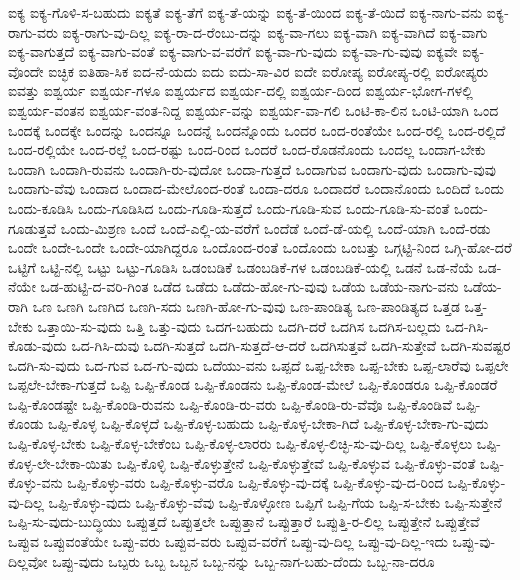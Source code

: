 {ಐಕ್ಯ
ಐಕ್ಯ-ಗೊಳಿ-ಸ-ಬಹುದು
ಐಕ್ಯತೆ
ಐಕ್ಯ-ತೆಗೆ
ಐಕ್ಯ-ತೆ-ಯನ್ನು
ಐಕ್ಯ-ತೆ-ಯಿಂದ
ಐಕ್ಯ-ತೆ-ಯಿದೆ
ಐಕ್ಯ-ನಾಗು-ವನು
ಐಕ್ಯ-ರಾಗು-ವರು
ಐಕ್ಯ-ರಾಗು-ವು-ದಿಲ್ಲ
ಐಕ್ಯ-ರಾ-ದ-ರೆಂಬು-ದನ್ನು
ಐಕ್ಯ-ವಾ-ಗಲು
ಐಕ್ಯ-ವಾಗಿ
ಐಕ್ಯ-ವಾಗಿದೆ
ಐಕ್ಯ-ವಾಗು
ಐಕ್ಯ-ವಾಗುತ್ತದೆ
ಐಕ್ಯ-ವಾಗು-ವಂತೆ
ಐಕ್ಯ-ವಾಗು-ವ-ವರೆಗೆ
ಐಕ್ಯ-ವಾ-ಗು-ವುದು
ಐಕ್ಯ-ವಾ-ಗು-ವುವು
ಐಕ್ಯವೇ
ಐಕ್ಯ-ವೊಂದೇ
ಐಚ್ಛಿಕ
ಐತಿಹಾ-ಸಿಕ
ಐದ-ನೆ-ಯದು
ಐದು
ಐದು-ಸಾ-ವಿರ
ಐದೇ
ಐರೋಪ್ಯ
ಐರೋಪ್ಯ-ರಲ್ಲಿ
ಐರೋಪ್ಯರು
ಐವತ್ತು
ಐಶ್ವರ್ಯ
ಐಶ್ವರ್ಯ-ಗಳೂ
ಐಶ್ವರ್ಯದ
ಐಶ್ವರ್ಯ-ದಲ್ಲಿ
ಐಶ್ವರ್ಯ-ದಿಂದ
ಐಶ್ವರ್ಯ-ಭೋಗ-ಗಳಲ್ಲಿ
ಐಶ್ವರ್ಯ-ವಂತನ
ಐಶ್ವರ್ಯ-ವಂತ-ನಿದ್ದ
ಐಶ್ವರ್ಯ-ವನ್ನು
ಐಶ್ವರ್ಯ-ವಾ-ಗಲಿ
ಒಂಟಿ-ಕಾ-ಲಿನ
ಒಂಟಿ-ಯಾಗಿ
ಒಂದ
ಒಂದಕ್ಕೆ
ಒಂದಕ್ಕೇ
ಒಂದನ್ನು
ಒಂದನ್ನೂ
ಒಂದನ್ನೆ
ಒಂದನ್ನೊಂದು
ಒಂದರ
ಒಂದ-ರಂತೆಯೇ
ಒಂದ-ರಲ್ಲಿ
ಒಂದ-ರಲ್ಲಿದೆ
ಒಂದ-ರಲ್ಲಿಯೇ
ಒಂದ-ರಲ್ಲೆ
ಒಂದ-ರಷ್ಟು
ಒಂದ-ರಿಂದ
ಒಂದರೆ
ಒಂದ-ರೊಡನೊಂದು
ಒಂದಲ್ಲ
ಒಂದಾಗ-ಬೇಕು
ಒಂದಾಗಿ
ಒಂದಾಗಿ-ರುವನು
ಒಂದಾಗಿ-ರು-ವುದೋ
ಒಂದಾ-ಗುತ್ತದೆ
ಒಂದಾಗುವ
ಒಂದಾಗು-ವುದು
ಒಂದಾಗು-ವುವು
ಒಂದಾಗು-ವೆವು
ಒಂದಾದ
ಒಂದಾದ-ಮೇಲೊಂದ-ರಂತೆ
ಒಂದಾ-ದರೂ
ಒಂದಾದರೆ
ಒಂದಾನೊಂದು
ಒಂದಿದೆ
ಒಂದು
ಒಂದು-ಕೂಡಿಸಿ
ಒಂದು-ಗೂಡಿಸಿದ
ಒಂದು-ಗೂಡಿ-ಸುತ್ತದೆ
ಒಂದು-ಗೂಡಿ-ಸುವ
ಒಂದು-ಗೂಡಿ-ಸು-ವಂತೆ
ಒಂದು-ಗೂಡುತ್ತವೆ
ಒಂದು-ಮಿಶ್ರಣ
ಒಂದೆ
ಒಂದೆ-ಎಲ್ಲಿ-ಯ-ವರೆಗೆ
ಒಂದೆಡೆ
ಒಂದೆ-ಡೆ-ಯಲ್ಲಿ
ಒಂದೆ-ಯಾಗಿ
ಒಂದೆ-ರಡು
ಒಂದೇ
ಒಂದೇ-ಒಂದೇ
ಒಂದೇ-ಯಾಗಿದ್ದರೂ
ಒಂದೊಂದ-ರಂತೆ
ಒಂದೊಂದು
ಒಂಬತ್ತು
ಒಗ್ಗಟ್ಟಿ-ನಿಂದ
ಒಗ್ಗಿ-ಹೋ-ದರೆ
ಒಟ್ಟಿಗೆ
ಒಟ್ಟಿ-ನಲ್ಲಿ
ಒಟ್ಟು
ಒಟ್ಟು-ಗೂಡಿಸಿ
ಒಡಂಬಡಿಕೆ
ಒಡಂಬಡಿಕೆ-ಗಳ
ಒಡಂಬಡಿಕೆ-ಯಲ್ಲಿ
ಒಡನೆ
ಒಡ-ನೆಯೆ
ಒಡ-ನೆಯೇ
ಒಡ-ಹುಟ್ಟಿ-ದ-ವರಿ-ಗಿಂತ
ಒಡೆದ
ಒಡೆದು
ಒಡೆದು-ಹೋ-ಗು-ವುವು
ಒಡೆಯ
ಒಡೆಯ-ನಾಗು-ವನು
ಒಡೆಯ-ರಾಗಿ
ಒಣ
ಒಣಗಿ
ಒಣಗಿದ
ಒಣಗಿ-ಸದು
ಒಣಗಿ-ಹೋ-ಗು-ವುವು
ಒಣ-ಪಾಂಡಿತ್ಯ
ಒಣ-ಪಾಂಡಿತ್ಯದ
ಒತ್ತಡ
ಒತ್ತ-ಬೇಕು
ಒತ್ತಾಯಿ-ಸು-ವುದು
ಒತ್ತಿ
ಒತ್ತು-ವುದು
ಒದಗ-ಬಹುದು
ಒದಗಿ-ದರೆ
ಒದಗಿಸ
ಒದಗಿಸ-ಬಲ್ಲದು
ಒದ-ಗಿಸಿ-ಕೊಡು-ವುದು
ಒದ-ಗಿಸಿ-ದುವು
ಒದಗಿ-ಸುತ್ತದೆ
ಒದಗಿ-ಸುತ್ತದೆ-ಆ-ದರೆ
ಒದಗಿಸುತ್ತವೆ
ಒದಗಿ-ಸುತ್ತೇವೆ
ಒದಗಿ-ಸುವಷ್ಟರ
ಒದಗಿ-ಸು-ವುದು
ಒದ-ಗುವ
ಒದ-ಗು-ವುದು
ಒದೆಯು-ವನು
ಒಪ್ಪದೆ
ಒಪ್ಪ-ಬೇಕಾ
ಒಪ್ಪ-ಬೇಕು
ಒಪ್ಪ-ಲಾರೆವು
ಒಪ್ಪಲೇ
ಒಪ್ಪಲೇ-ಬೇಕಾ-ಗುತ್ತದೆ
ಒಪ್ಪಿ
ಒಪ್ಪಿ-ಕೊಂಡ
ಒಪ್ಪಿ-ಕೊಂಡನು
ಒಪ್ಪಿ-ಕೊಂಡ-ಮೇಲೆ
ಒಪ್ಪಿ-ಕೊಂಡರೂ
ಒಪ್ಪಿ-ಕೊಂಡರೆ
ಒಪ್ಪಿ-ಕೊಂಡಷ್ಟೇ
ಒಪ್ಪಿ-ಕೊಂಡಿ-ರುವನು
ಒಪ್ಪಿ-ಕೊಂಡಿ-ರು-ವರು
ಒಪ್ಪಿ-ಕೊಂಡಿ-ರು-ವೆವೊ
ಒಪ್ಪಿ-ಕೊಂಡಿವೆ
ಒಪ್ಪಿ-ಕೊಂಡು
ಒಪ್ಪಿ-ಕೊಳ್ಳ
ಒಪ್ಪಿ-ಕೊಳ್ಳದೆ
ಒಪ್ಪಿ-ಕೊಳ್ಳ-ಬಹುದು
ಒಪ್ಪಿ-ಕೊಳ್ಳ-ಬೇಕಾ-ಗಿದೆ
ಒಪ್ಪಿ-ಕೊಳ್ಳ-ಬೇಕಾ-ಗು-ವುದು
ಒಪ್ಪಿ-ಕೊಳ್ಳ-ಬೇಕು
ಒಪ್ಪಿ-ಕೊಳ್ಳ-ಬೇಕೆಂಬ
ಒಪ್ಪಿ-ಕೊಳ್ಳ-ಲಾರರು
ಒಪ್ಪಿ-ಕೊಳ್ಳ-ಲಿಚ್ಛಿ-ಸು-ವು-ದಿಲ್ಲ
ಒಪ್ಪಿ-ಕೊಳ್ಳಲು
ಒಪ್ಪಿ-ಕೊಳ್ಳ-ಲೇ-ಬೇಕಾ-ಯಿತು
ಒಪ್ಪಿ-ಕೊಳ್ಳಿ
ಒಪ್ಪಿ-ಕೊಳ್ಳುತ್ತೇನೆ
ಒಪ್ಪಿ-ಕೊಳ್ಳುತ್ತೇವೆ
ಒಪ್ಪಿ-ಕೊಳ್ಳುವ
ಒಪ್ಪಿ-ಕೊಳ್ಳು-ವಂತೆ
ಒಪ್ಪಿ-ಕೊಳ್ಳು-ವನು
ಒಪ್ಪಿ-ಕೊಳ್ಳು-ವರು
ಒಪ್ಪಿ-ಕೊಳ್ಳು-ವರೊ
ಒಪ್ಪಿ-ಕೊಳ್ಳು-ವು-ದಕ್ಕೆ
ಒಪ್ಪಿ-ಕೊಳ್ಳು-ವು-ದ-ರಿಂದ
ಒಪ್ಪಿ-ಕೊಳ್ಳು-ವು-ದಿಲ್ಲ
ಒಪ್ಪಿ-ಕೊಳ್ಳು-ವುದು
ಒಪ್ಪಿ-ಕೊಳ್ಳು-ವೆವು
ಒಪ್ಪಿ-ಕೊಳ್ಳೋಣ
ಒಪ್ಪಿಗೆ
ಒಪ್ಪಿ-ಗೆಯ
ಒಪ್ಪಿ-ಸ-ಬೇಕು
ಒಪ್ಪಿ-ಸುತ್ತೇನೆ
ಒಪ್ಪಿ-ಸು-ವುದು-ಬುದ್ಧಿಯು
ಒಪ್ಪುತ್ತದೆ
ಒಪ್ಪುತ್ತಲೇ
ಒಪ್ಪುತ್ತಾನೆ
ಒಪ್ಪುತ್ತಾರೆ
ಒಪ್ಪುತ್ತಿ-ರ-ಲಿಲ್ಲ
ಒಪ್ಪುತ್ತೇನೆ
ಒಪ್ಪುತ್ತೇವೆ
ಒಪ್ಪುವ
ಒಪ್ಪುವಂತೆಯೇ
ಒಪ್ಪು-ವರು
ಒಪ್ಪುವ-ವರು
ಒಪ್ಪುವ-ವರೆಗೆ
ಒಪ್ಪು-ವು-ದಿಲ್ಲ
ಒಪ್ಪು-ವು-ದಿಲ್ಲ-ಇದು
ಒಪ್ಪು-ವು-ದಿಲ್ಲವೋ
ಒಪ್ಪು-ವುದು
ಒಬ್ಪರು
ಒಬ್ಬ
ಒಬ್ಬನ
ಒಬ್ಬ-ನನ್ನು
ಒಬ್ಬ-ನಾಗ-ಬಹು-ದೆಂದು
ಒಬ್ಬ-ನಾ-ದರೂ
}
